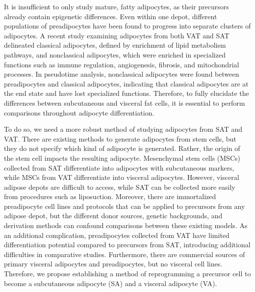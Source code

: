 It is insufficient to only study mature, fatty adipocytes, as their precursors already contain epigenetic differences\cite{Macotela2012-wy}. Even within one depot, different populations of preadipocytes have been found to progress into separate clusters of adipocytes\cite{Ramirez2020-jz}. A recent study examining adipocytes from both VAT and SAT delineated classical adipocytes, defined by enrichment of lipid metabolism pathways, and nonclassical adipocytes, which were enriched in specialized functions such as immune regulation, angiogenesis, fibrosis, and mitochondrial processes\cite{Lazarescu2025-ru}. In pseudotime analysis, nonclassical adipocytes were found between preadipocytes and classical adipocytes, indicating that classical adipocytes are at the end state and have lost specialized functions. Therefore, to fully elucidate the differences between subcutaneous and visceral fat cells, it is essential to perform comparisons throughout adipocyte differentiation.   

To do so, we need a more robust method of studying adipocytes from SAT and VAT. There are existing methods to generate adipocytes from stem cells\cite{Taura2009-is,Noguchi2013-od}, but they do not specify which kind of adipocyte is generated. Rather, the origin of the stem cell impacts the resulting adipocyte. Mesenchymal stem cells (MSCs) collected from SAT differentiate into adipocytes with subcutaneous markers, while MSCs from VAT differentiate into visceral adipocytes\cite{Macotela2012-wy,Mathur2022-fx}. However, visceral adipose depots are difficult to access, while SAT can be collected more easily from procedures such as liposuction\cite{Hafner2014-qp}. Moreover, there are immortalized preadipocyte cell lines\cite{Church2015-gf} and protocols that can be applied to precursors from any adipose depot\cite{Darimont2003-ev}, but the different donor sources, genetic backgrounds, and derivation methods can confound comparisons between these existing models\cite{Kassner2020-mo}. As an additional complication, preadipocytes collected from VAT have limited differentiation potential compared to precursors from SAT, introducing additional difficulties in comparative studies\cite{Dufau2021-vi}. Furthermore, there are commercial sources of primary visceral adipocytes and preadipocytes, but no visceral cell lines\cite{Natsume2020-pr}. Therefore, we propose establishing a method of reprogramming a precursor cell to become a subcutaneous adipocyte (SA) and a visceral adipocyte (VA).   

